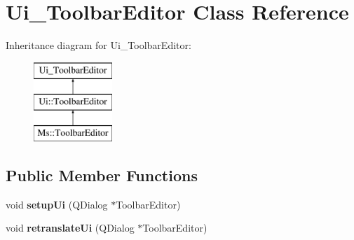 \hypertarget{class_ui___toolbar_editor}{}\section{Ui\+\_\+\+Toolbar\+Editor Class Reference}
\label{class_ui___toolbar_editor}
Inheritance diagram for Ui\+\_\+\+Toolbar\+Editor\+:\begin{figure}[H]
\begin{center}
\leavevmode
\includegraphics[height=3.000000cm]{class_ui___toolbar_editor}
\end{center}
\end{figure}
\subsection*{Public Member Functions}
\begin{DoxyCompactItemize}
\item 
\mbox{\label{class_ui___toolbar_editor_a3662b786df658fe2e48c6076eec4e7e7}} 
void {\bfseries setup\+Ui} (Q\+Dialog $\ast$Toolbar\+Editor)
\item 
\mbox{\label{class_ui___toolbar_editor_ac69a5c495ae064fd450e4ba24c2b1781}} 
void {\bfseries retranslate\+Ui} (Q\+Dialog $\ast$Toolbar\+Editor)
\end{DoxyCompactItemize}
